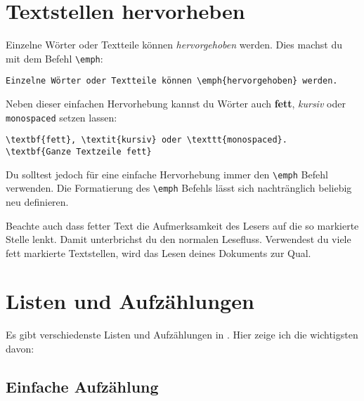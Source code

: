 \section{Textstellen hervorheben}

Einzelne Wörter oder Textteile können \emph{hervorgehoben} werden. Dies machst du mit dem Befehl \texttt{\textbackslash emph}:
\begin{lstlisting}
Einzelne Wörter oder Textteile können \emph{hervorgehoben} werden.
\end{lstlisting}

Neben dieser einfachen Her\-vor\-he\-bung kannst du Wörter auch \textbf{fett}, \textit{kursiv} oder\\ \texttt{monospaced} setzen lassen:
\begin{lstlisting}
\textbf{fett}, \textit{kursiv} oder \texttt{monospaced}.
\textbf{Ganze Textzeile fett}
\end{lstlisting}

Du solltest jedoch für eine einfache Hervorhebung immer den \texttt{\textbackslash emph} Befehl verwenden. Die Formatierung des \texttt{\textbackslash emph} Befehls lässt sich nachtränglich beliebig neu definieren.

Beachte auch dass fetter Text die Aufmerksamkeit des Lesers auf die so markierte Stelle lenkt. Damit unterbrichst du den normalen Lesefluss. Verwendest du viele fett markierte Textstellen, wird das Lesen deines Dokuments zur Qual.

\section{Listen und Aufzählungen}

Es gibt verschiedenste Listen und Aufzählungen in \DMLLaTeX. Hier zeige ich die wichtigsten davon:

\subsection{Einfache Aufzählung}

